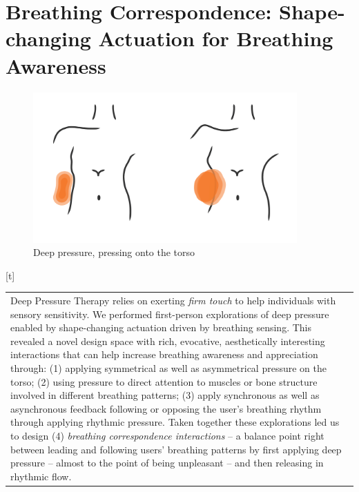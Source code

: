 
\section{Breathing Correspondence: Shape-changing Actuation for Breathing Awareness}

\begin{figure}[t]
  \centering  
  \includegraphics[width=0.9\textwidth]{Chapters/Figures/soma_chi/deep_pressure_graphic-01.png}
  \caption{Deep pressure, pressing onto the torso}
  \label{fig:teaser}
\end{figure}[t]


\begin{center}
\begin{tabular}{ p{13cm}}
Deep Pressure Therapy relies on exerting \textit{firm touch} to help individuals with sensory sensitivity. We performed first-person explorations of deep pressure enabled by shape-changing actuation driven by breathing sensing. This revealed a novel design space with rich, evocative, aesthetically interesting interactions that can help increase breathing awareness and appreciation through: (1) applying symmetrical as well as asymmetrical pressure on the torso; (2) using pressure to direct attention to muscles or bone structure involved in different breathing patterns; (3) apply synchronous as well as asynchronous feedback following or opposing the user's breathing rhythm through applying rhythmic pressure. Taken together these explorations led us to design (4) \textit{breathing correspondence interactions} -- a balance point right between leading and following users' breathing patterns by first applying deep pressure -- almost to the point of being unpleasant -- and then releasing in rhythmic flow.
\end{tabular}
\end{center}

